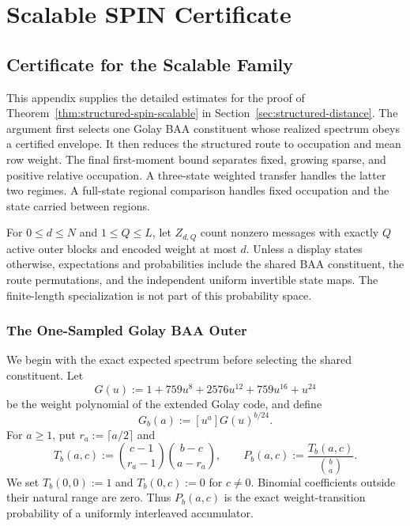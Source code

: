 \section{Scalable SPIN Certificate}
\label{app:structured}

\subsection{Certificate for the Scalable Family}
\label{app:structured-scalable-certificate}

This appendix supplies the detailed estimates for the proof of
Theorem~\ref{thm:structured-spin-scalable} in
Section~\ref{sec:structured-distance}. The argument
first selects one Golay BAA constituent whose realized spectrum obeys a
certified envelope. It then reduces the structured route to occupation and
mean row weight. The final first-moment bound separates fixed, growing
sparse, and positive relative occupation. A three-state weighted transfer
handles the latter two regimes. A full-state regional comparison handles
fixed occupation and the state carried between regions.

For $0\le d\le N$ and $1\le Q\le L$, let $Z_{d,Q}$ count nonzero messages
with exactly $Q$ active outer blocks and encoded weight at most $d$. Unless a
display states otherwise, expectations and probabilities include the shared
BAA constituent, the route permutations, and the independent uniform
invertible state maps. The
finite-length specialization is not part of this probability space.

\subsubsection{The One-Sampled Golay BAA Outer}

We begin with the exact expected spectrum before selecting the shared
constituent. Let
\[
  G(u):=1+759u^8+2576u^{12}+759u^{16}+u^{24}
\]
be the weight polynomial of the extended Golay code, and define
\[
  G_b(a):=[u^a]G(u)^{b/24}.
\]
For $a\ge1$, put $r_a:=\lceil a/2\rceil$ and
\begin{equation}
  T_b(a,c)
  :=
  \binom{c-1}{r_a-1}\binom{b-c}{a-r_a},
  \qquad
  P_b(a,c):=\frac{T_b(a,c)}{\binom ba}.
  \label{eq:structured-acc-transition}
\end{equation}
We set $T_b(0,0):=1$ and $T_b(0,c):=0$ for $c\ne0$. Binomial coefficients
outside their natural range are zero. Thus $P_b(a,c)$ is the exact
weight-transition probability of a uniformly interleaved accumulator.

